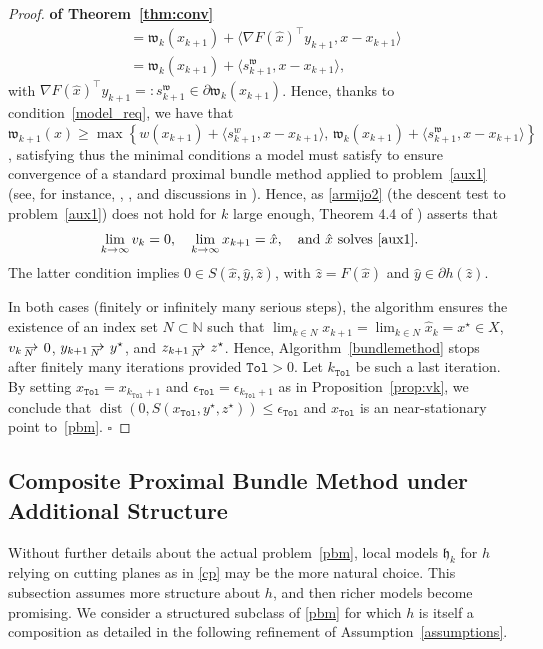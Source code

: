 \documentclass[smallextended,envcountsect]{svjour3}
\newcommand{\col}[1]{\left\{#1\right\}}
\newcommand{\tol}{\texttt{Tol}}
\newcommand{\inner}[2]{\langle#1,#2\rangle}
\newcommand{\modelh}{\mathfrak{h}}
\newcommand{\mybox}{{\hfill $\square$}}
\newcommand{\nats}{\mathbb{N}}
\DeclareMathOperator{\dist}{dist}
\def\Nto{\,{\raise 1pt\hbox{$\rightarrow$}}\kern -12pt
     \hbox{\lower 3pt \hbox{$\, \scriptstyle N$}}\hskip7pt}
\begin{document}
\begin{proof} {\bf of Theorem~\ref{thm:conv}}
\begin{align*}
&= \mathfrak{w}_k(x_{k+1})+\inner{\nabla F(\hat x)^\top y_{k+1}}{x-x_{k+1}}\\
&=\mathfrak{w}_k(x_{k+1})+\inner{s^{\mathfrak{w}}_{k+1}}{x-x_{k+1}},
\end{align*}
with $\nabla F(\hat x)^\top y_{k+1}=:s^{\mathfrak{w}}_{k+1} \in \partial \mathfrak{w}_k(x_{k+1})$. Hence, thanks to condition~\eqref{model_req}, we have that $\mathfrak{w}_{k+1}(x)\geq \max\col{w(x_{k+1})+\inner{s^w_{k+1}}{x-x_{k+1}},\,\mathfrak{w}_k(x_{k+1})+\inner{s^{\mathfrak{w}}_{k+1}}{x-x_{k+1}}}$, satisfying thus the minimal conditions a model must satisfy to ensure convergence of a standard proximal bundle  method applied to problem~\eqref{aux1} (see, for instance, \cite[\S 4]{Correa_Lemarechal_1993}, \cite[\S 4.1]{vanAckooij_Bello-Cruz_Oliveira_2016}, and discussions in \cite[\S 3]{Frangioni_Gorgone_2014}). Hence, as \eqref{armijo2} (the descent test to problem~\eqref{aux1}) does not hold for $k$ large enough, Theorem 4.4 of \cite{Correa_Lemarechal_1993}) asserts that 
\[
\lim_{k\to \infty} v_k =0,\quad \lim_{k \to\infty}x_{k+1}=\hat x, \quad \mbox{and $\hat x$ solves~\eqref{aux1}.}
\]
The latter condition implies $0 \in S(\hat x,\hat y,\hat z)$, with $\hat z= F(\hat x)$ and $\hat y \in \partial h(\hat z)$. 


In both cases (finitely or infinitely many serious steps), the algorithm ensures the existence of an index set $N\subset \nats$ such that  $ \lim_{k \in N}  x_{k+1} = \lim_{k \in N} \hat x_{k}  = x ^\star\in X$, $ v_k \Nto 0$, $ y_{k+1} \Nto y^\star$, and $ z_{k+1} \Nto z^\star$. Hence, Algorithm~\ref{bundlemethod} stops after finitely many iterations provided $\tol>0$.
Let $k_{\tol}$ be such a last iteration. By setting  $x_{\tol}=x_{k_\tol+1}$ and $\epsilon_\tol = \epsilon_{k_\tol +1}$ as in Proposition~\ref{prop:vk}, we conclude that $\dist (0, S(x_\tol,y^\star,z^\star))\leq \epsilon_\tol$ and $x_\tol$ is an near-stationary point to~\eqref{pbm}.
\mybox
\end{proof}



\subsection{Composite Proximal Bundle Method under Additional Structure}\label{sec:special}

Without further details about the actual problem~\eqref{pbm}, local models $\modelh_k$ for $h$ relying on cutting planes as in \eqref{cp} may be the more natural choice. This subsection assumes more structure about $h$, and then richer models become promising. We consider a structured subclass of \eqref{pbm} for which $h$ is itself a composition as detailed in the following refinement of Assumption~\ref{assumptions}.
\end{document}
